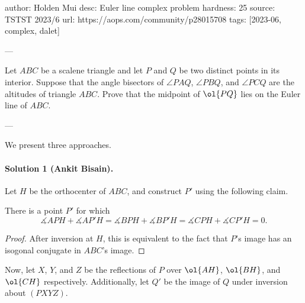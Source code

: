 author: Holden Mui
desc: Euler line complex problem
hardness: 25
source: TSTST 2023/6
url: https://aops.com/community/p28015708
tags: [2023-06, complex, dalet]

---

Let $ABC$ be a scalene triangle
and let $P$ and $Q$ be two distinct points in its interior.
Suppose that the angle bisectors of $\angle PAQ$, $\angle PBQ$,
and $\angle PCQ$ are the altitudes of triangle $ABC$.
Prove that the midpoint of $\ol{PQ}$ lies on the Euler line of $ABC$.

---

We present three approaches.

\paragraph{Solution 1 (Ankit Bisain).}
Let $H$ be the orthocenter of $ABC$, and construct $P'$ using the following claim.

\begin{claim*}
    There is a point $P'$ for which \[\measuredangle APH + \measuredangle AP'H = \measuredangle BPH + \measuredangle BP'H = \measuredangle CPH + \measuredangle CP'H = 0.\]
\end{claim*}

\begin{proof}
    After inversion at $H$, this is equivalent to the fact that $P$'s image has an isogonal conjugate in $ABC$'s image.
\end{proof}

Now, let $X$, $Y$, and $Z$ be the reflections of $P$ over $\ol{AH}$, $\ol{BH}$, and $\ol{CH}$ respectively. Additionally, let $Q'$ be the image of $Q$ under inversion about $(PXYZ)$.

